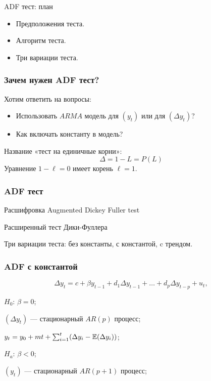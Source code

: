 
\begin{frame} %


\end{frame}



\begin{frame}{ADF тест: план}
  \begin{itemize}[<+->]
    \item Предположения теста.
    \item Алгоритм теста.
    \item Три вариации теста.
  \end{itemize}

\end{frame}


\begin{frame}
  \frametitle{Зачем нужен ADF тест?}

  Хотим ответить на вопросы:
  \pause
  \begin{itemize}[<+->]
    \item Использовать $ARMA$ модель для $(y_t)$ или для $(\Delta y_t)$?
    \item Как включать константу в модель?
  \end{itemize}

  \pause
  Название «тест на единичные корни»:
  \pause
  \[
  \Delta = 1 - L = P(L) 
  \]
  Уравнение $1 - \ell = 0$ имеет корень $\ell =1$.

\end{frame}

\begin{frame}
  \frametitle{ADF тест}
  
  \begin{block}{Расшифровка}
    Augmented Dickey Fuller test
    
    Расширенный тест Дики-Фуллера  
  \end{block}

  \pause 
  Три вариации теста: без константы, с константой, c трендом.
  
\end{frame}


\begin{frame}
  \frametitle{ADF с константой}
  \[
  \Delta y_t = c + \beta y_{t-1} + d_1 \Delta y_{t-1} + \ldots + d_p \Delta y_{t-p} + u_t,  
  \]

  \pause

  \alert{$H_0$: $\beta = 0$};
  
  $(\Delta y_t)$ — стационарный $AR(p)$ процесс;

  $y_t = y_0 + mt + \sum_{i=1}^t (\Delta y_i - \mathbb{E}(\Delta y_i))$;

  \pause

  \alert{$H_a$: $\beta < 0$};

  $(y_t)$ — стационарный $AR(p + 1)$ процесс;

\end{frame}

